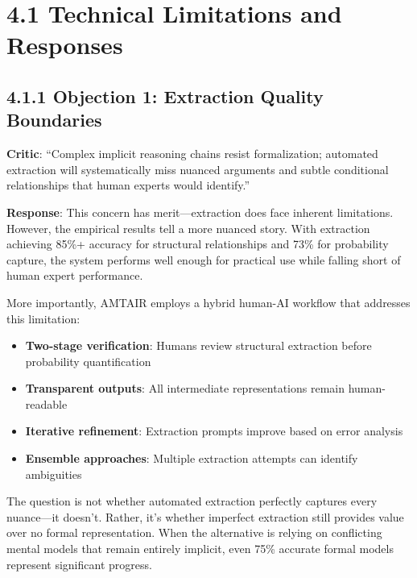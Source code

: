 \documentclass[
  11pt,
  letterpaper,
]{book}
\providecommand{\tightlist}{%
  \setlength{\itemsep}{0pt}\setlength{\parskip}{0pt}}
\begin{document}
\section*{4.1 Technical Limitations and
Responses}\label{sec-technical-limitations}


\subsection*{4.1.1 Objection 1: Extraction Quality
Boundaries}\label{sec-extraction-boundaries}

\textbf{Critic}: ``Complex implicit reasoning chains resist
formalization; automated extraction will systematically miss nuanced
arguments and subtle conditional relationships that human experts would
identify.''

\textbf{Response}: This concern has merit---extraction does face
inherent limitations. However, the empirical results tell a more nuanced
story. With extraction achieving 85\%+ accuracy for structural
relationships and 73\% for probability capture, the system performs well
enough for practical use while falling short of human expert
performance.

More importantly, AMTAIR employs a hybrid human-AI workflow that
addresses this limitation:

\begin{itemize}
\tightlist
\item
  \textbf{Two-stage verification}: Humans review structural extraction
  before probability quantification
\item
  \textbf{Transparent outputs}: All intermediate representations remain
  human-readable\\
\item
  \textbf{Iterative refinement}: Extraction prompts improve based on
  error analysis
\item
  \textbf{Ensemble approaches}: Multiple extraction attempts can
  identify ambiguities
\end{itemize}

The question is not whether automated extraction perfectly captures
every nuance---it doesn't. Rather, it's whether imperfect extraction
still provides value over no formal representation. When the alternative
is relying on conflicting mental models that remain entirely implicit,
even 75\% accurate formal models represent significant progress.
\end{document}
